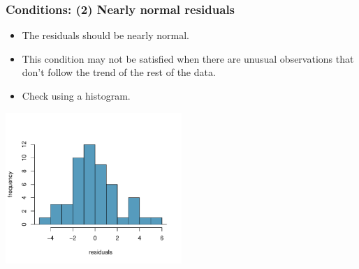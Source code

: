 
\begin{frame}
\frametitle{Conditions: (2) Nearly normal residuals}

\begin{itemize}

\item The residuals should be nearly normal.

\pause

\item This condition may not be satisfied when there are unusual observations that don't follow the trend of the rest of the data.

\pause

\item Check using a histogram.

\end{itemize}

\begin{center}
\includegraphics[width=0.5\textwidth]{8-2_least_square_reg/figures/poverty/normal_res}
\end{center}

\end{frame}


